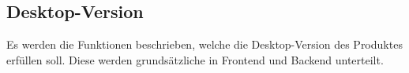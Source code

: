 \subsection{Desktop-Version}
Es werden die Funktionen beschrieben, welche die Desktop-Version des Produktes erfüllen soll. Diese werden grundsätzliche in Frontend und Backend unterteilt.


